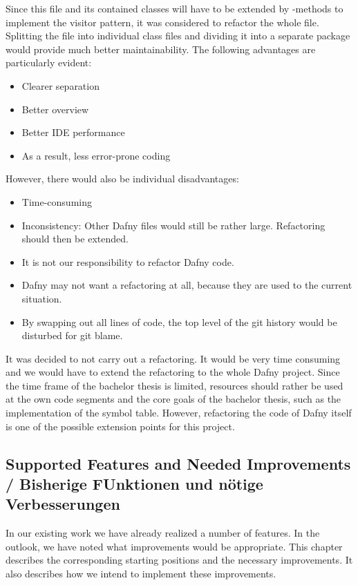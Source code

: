Since this file and its contained classes will have to be extended by -methods
to implement the visitor pattern, it was considered to refactor the whole file.\\

Splitting the file into individual class files and dividing it into a separate package would provide much better maintainability.
The following advantages are particularly evident:
\begin{itemize}
    \item Clearer separation
    \item Better overview
    \item Better IDE performance
    \item As a result, less error-prone coding
\end{itemize}

However, there would also be individual disadvantages:
\begin{itemize}
    \item Time-consuming
    \item Inconsistency: Other Dafny files would still be rather large. Refactoring should then be extended.
    \item It is not our responsibility to refactor Dafny code.
    \item Dafny may not want a refactoring at all, because they are used to the current situation.
    \item By swapping out all lines of code, the top level of the git history would be disturbed for git blame.
\end{itemize}

It was decided to not carry out a refactoring.
It would be very time consuming and we would have to extend the refactoring to the whole Dafny project.
Since the time frame of the bachelor thesis is limited, resources should rather be used at the own code segments and the core goals of the bachelor thesis, such as the implementation of the symbol table.
However, refactoring the code of Dafny itself is one of the possible extension points for this project.


\subsection{Supported Features and Needed Improvements / Bisherige FUnktionen und nötige Verbesserungen}
\label{section:analysis:features}

In our existing work we have already realized a number of features.
In the outlook, we have noted what improvements would be appropriate.
This chapter describes the corresponding starting positions and the necessary improvements.
It also describes how we intend to implement these improvements.

